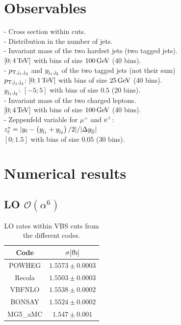 \documentclass[a4paper,10pt]{report}
\begin{document}
\section{Observables}
- Cross section within cuts. \\
- Distribution in the number of jets. \\
- Invariant mass of the two hardest jets (two tagged jets). \\
$[0; 4\,\text{TeV}]$ with bins of size $100\,\text{GeV}$ (40 bins). \\
- $p_{\text{T},\text{j}_1,\text{j}_2}$ and $y_{\text{j}_1,\text{j}_2}$ of the two tagged jets (not their sum) \\
$p_{\text{T},\text{j}_1,\text{j}_2}$: $[0; 1\,\text{TeV}]$ with bins of size $25\,\text{GeV}$ (40 bins). \\
$y_{\text{j}_1,\text{j}_2}$: $[-5;5]$ with bins of size $0.5$ (20 bins). \\
- Invariant mass of the two charged leptons. \\
$[0; 4\,\text{TeV}]$ with bins of size $100\,\text{GeV}$ (40 bins). \\
- Zeppenfeld variable for $\mu^+$ and $\text{e}^+$: \\
$z^*_\ell = |y_\ell - \left(y_{\text{j}_1}+y_{\text{j}_2} \right)/2|/|\Delta y_{\text{j}\text{j}}|$ \\
$[0;1.5]$ with bins of size $0.05$ (30 bins).

\section{Numerical results}

\subsection{LO $\mathcal{O}\left(\alpha^6\right)$}

\begin{table}[h!]
    \begin{tabular}{c|c}
        Code  &  $\sigma[\rm{fb}]$  \\
        \hline
        \hline
        {\sc POWHEG}  &  $1.5573 \pm 0.0003$ \\
        {\sc Recola}  &  $1.5503 \pm 0.0003$ \\
        {\sc VBFNLO}  &  $1.5538 \pm 0.0002$ \\
        {\sc BONSAY}  &  $1.5524 \pm 0.0002$ \\
        {\sc MG5\_aMC}&  $1.547 \pm 0.001$   
    \end{tabular}
    \caption{\label{tab:LOrates} LO rates within VBS cuts from the different codes.}
\end{table}
\end{document}
